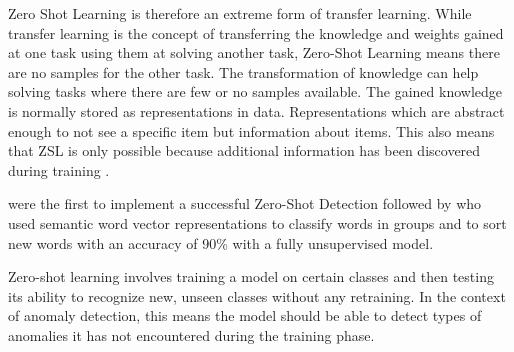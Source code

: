 Zero Shot Learning is therefore an extreme form of transfer learning. While transfer learning is the concept of transferring the knowledge and weights gained at one task using them at solving another task, Zero-Shot Learning means there are no samples for the other task. The transformation of knowledge can help solving tasks where there are few or no samples available. The gained knowledge is normally stored as representations in data. Representations which are abstract enough to not see a specific item but information about items. This also means that ZSL is only possible because additional information has been discovered during training .

 were the first to implement a successful Zero-Shot Detection followed by  who used semantic word vector representations to classify words in groups and to sort new words with an accuracy of 90\% with a fully unsupervised model.

Zero-shot learning involves training a model on certain classes and then testing its ability to recognize new, unseen classes without any retraining. In the context of anomaly detection, this means the model should be able to detect types of anomalies it has not encountered during the training phase.